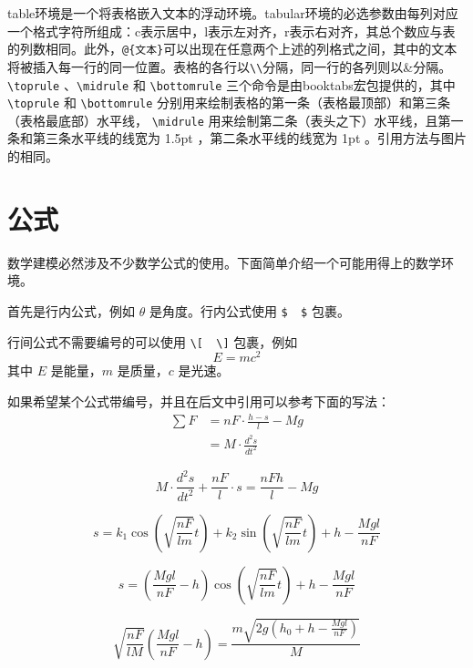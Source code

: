 \documentclass[withoutpreface,bwprint]{cumcmthesis} %
\begin{document}
\bigskip

table环境是一个将表格嵌入文本的浮动环境。tabular环境的必选参数由每列对应一个格式字符所组成：c表示居中，l表示左对齐，r表示右对齐，其总个数应与表的列数相同。此外，\verb|@{文本}|可以出现在任意两个上述的列格式之间，其中的文本将被插入每一行的同一位置。表格的各行以\verb|\\|分隔，同一行的各列则以\&分隔。 \verb|\toprule| 、\verb|\midrule| 和 \verb|\bottomrule| 三个命令是由booktabs宏包提供的，其中 \verb|\toprule| 和 \verb|\bottomrule| 分别用来绘制表格的第一条（表格最顶部）和第三条（表格最底部）水平线， \verb|\midrule| 用来绘制第二条（表头之下）水平线，且第一条和第三条水平线的线宽为 1.5pt ，第二条水平线的线宽为 1pt 。引用方法与图片的相同。

\section{公式}

数学建模必然涉及不少数学公式的使用。下面简单介绍一个可能用得上的数学环境。

首先是行内公式，例如 $ \theta $ 是角度。行内公式使用 \verb|$  $| 包裹。

行间公式不需要编号的可以使用 \verb|\[  \]| 包裹，例如
\[
E=mc^2
\]
其中 $ E $ 是能量，$ m $ 是质量，$ c $ 是光速。

如果希望某个公式带编号，并且在后文中引用可以参考下面的写法：
\begin{align}
\sum F  &= n F\cdot \frac{h-s}{l}-M g \\
 &=M\cdot \frac{d^{2}s}{dt^{2}}
\label{1}
\end{align}

\begin{equation}
M\cdot\frac{d^{2}s}{dt^{2}}+\frac{nF}{l}\cdot s = \frac{nFh}{l}-Mg
\label{2}
\end{equation}

\begin{equation}
s=k_1\cos\left (  \sqrt{ \frac{nF}{lm}} t\right ) +k_2\sin\left ( \sqrt{\frac{nF}{lm}} t\right ) +h-\frac{Mgl}{nF}  
\end{equation}


\begin{equation}
s=\left ( \frac{Mgl}{nF}-h \right )\cos\left (  \sqrt{ \frac{nF}{lm}} t\right ) +h-\frac{Mgl}{nF}  
\end{equation}


\begin{equation}
\sqrt{\frac{nF}{lM}}\left ( \frac{Mgl}{nF}-h \right )=\frac{m\sqrt{2g\left ( h_0+h-\frac{Mgl}{nF} \right )}}{M}
\end{equation}
\end{document}
